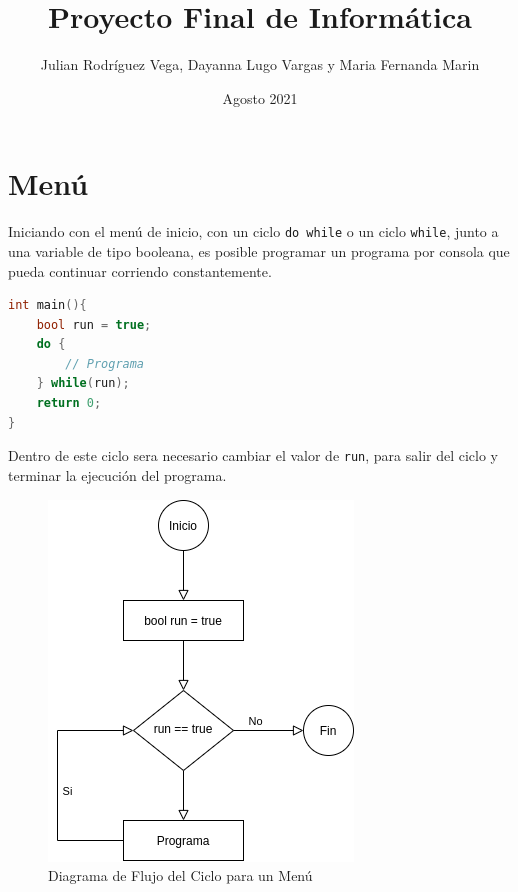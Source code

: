 \documentclass[12pt]{article}
\title{Proyecto Final de Informática}
\author{Julian Rodríguez Vega, Dayanna Lugo Vargas y Maria Fernanda Marin}
\date{Agosto 2021}
\begin{document}
\begin{titlepage}
\maketitle
\end{titlepage}

\section{Menú}

Iniciando con el menú de inicio, con un ciclo \verb+do while+ o un ciclo \verb+while+, junto a una variable de tipo booleana, es posible programar un programa por consola que pueda continuar corriendo constantemente.

\begin{lstlisting}[language=c++]
int main(){
    bool run = true;
    do {
        // Programa
    } while(run);
    return 0;
}
\end{lstlisting}

Dentro de este ciclo  sera necesario cambiar el valor de \verb+run+, para salir del ciclo y terminar la ejecución del programa.

\begin{figure}[h]
\caption{Diagrama de Flujo del Ciclo para un Menú}
\centering
\includegraphics[scale=0.5]{menu_loop.png}
\end{figure}
\end{document}
